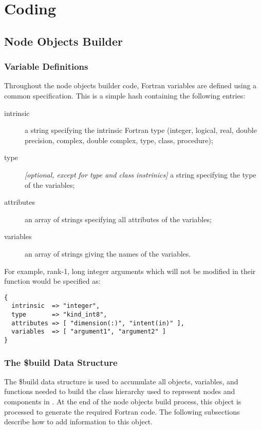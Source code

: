 \chapter{Coding \glc}

\section{Node Objects Builder}

\subsection{Variable Definitions}\label{sec:nodeBuilderVariableDefinitions}

Throughout the node objects builder code, Fortran variables are defined using a common specification. This is a simple hash containing the following entries:
\begin{description}
  \item[intrinsic] a string specifying the intrinsic Fortran type ({\normalfont \ttfamily integer}, {\normalfont \ttfamily logical}, {\normalfont \ttfamily real}, {\normalfont \ttfamily double precision}, {\normalfont \ttfamily complex}, {\normalfont \ttfamily double complex}, {\normalfont \ttfamily type}, {\normalfont \ttfamily class}, {\normalfont \ttfamily procedure});
  \item[type] \emph{[optional, except for {\normalfont \ttfamily type} and {\normalfont \ttfamily class} instrinics]} a string specifying the type of the variables;
  \item[attributes] an array of strings specifying all attributes of the variables;
  \item[variables] an array of strings giving the names of the variables.
\end{description}
For example, rank-1, long integer arguments which will not be modified in their function would be specified as:
\begin{verbatim}
{
  intrinsic  => "integer", 
  type       => "kind_int8",
  attributes => [ "dimension(:)", "intent(in)" ],
  variables  => [ "argument1", "argument2" ]
}
\end{verbatim}

\subsection{The {\normalfont \ttfamily \$build} Data Structure}

The {\normalfont \ttfamily \$build} data structure is used to accumulate all objects, variables, and functions needed to build the class hierarchy used to represent nodes and components in \glc. At the end of the node objects build process, this object is processed to generate the required Fortran code. The following subsections describe how to add information to this object.

